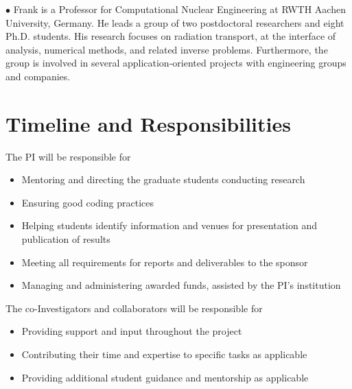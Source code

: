 \documentclass[12pt]{article}
\begin{document}
$\bullet$ Frank is a Professor for Computational Nuclear Engineering at RWTH Aachen University, Germany.
He leads a group of two postdoctoral researchers and eight Ph.D. students.
His research focuses on radiation transport, at the interface of analysis, numerical methods, and related inverse problems.
Furthermore, the group is involved in several application-oriented projects with engineering groups and companies.


\section{Timeline and Responsibilities}

The PI will be responsible for
\begin{itemize}[noitemsep]
\item Mentoring and directing the graduate students conducting research
\item Ensuring good coding practices
\item Helping students identify information and venues for presentation and publication of results
\item Meeting all requirements for reports and deliverables to the sponsor
\item Managing and administering awarded funds, assisted by the PI's institution
\end{itemize}

The co-Investigators and collaborators will be responsible for
\begin{itemize}[noitemsep]
\item Providing support and input throughout the project
\item Contributing their time and expertise to specific tasks as applicable
\item Providing additional student guidance and mentorship as applicable
\end{itemize}
\end{document}
